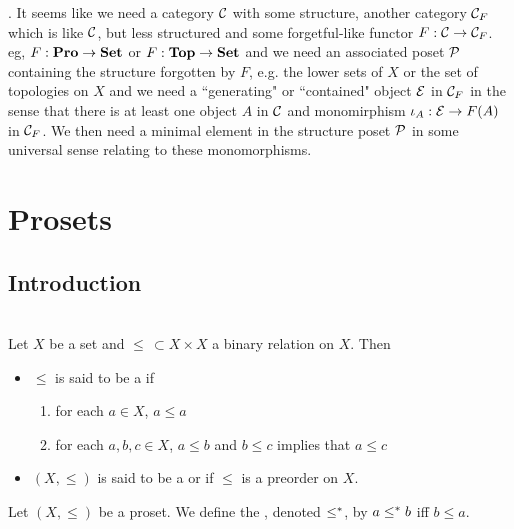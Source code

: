 \documentclass{book}
\begin{document}
	. It seems like we need a category $\mathcal{C}$ with some structure, another category $\mathcal{C}_F$ which is like $\mathcal{C}$, but less structured and some forgetful-like functor $F: \mathcal{C}\rightarrow \mathcal{C}_F$. eg, $F:\textbf{Pro} \rightarrow \text{\textbf{Set}}$ or $F:\operatorname*{\text{\textbf{Top}}} \rightarrow \text{\textbf{Set}}$ and we need an associated poset $\mathcal{P}$ containing the structure forgotten by $F$, e.g. the lower sets of $X$ or the set of topologies on $X$ and we need a ``generating" or ``contained" object $\mathcal{E}$ in $\mathcal{C}_F$ in the sense that there is at least one object $A$ in $\mathcal{C}$ and monomirphism $\iota_A: \mathcal{E} \rightarrow F(A)$ in $\mathcal{C}_F$. We then need a minimal element in the structure poset $\mathcal{P}$ in some universal sense relating to these monomorphisms. 
	
	
	
	\chapter{Prosets}
	
	\section{Introduction}
	
	\begin{defn}   \\
		Let $X$ be a set and $\leq \, \subset X \times X$ a binary relation on $X$. Then 
		\begin{itemize}
			\item $\leq$ is said to be a  if
			\begin{enumerate}
				\item for each $a \in X$, $a \leq a$
				\item for each $a, b, c \in X$, $a \leq b$ and $b \leq c$ implies that $a \leq c$
			\end{enumerate}
			\item $(X, \leq)$ is said to be a  or  if $\leq$ is a preorder on $X$.
		\end{itemize}
	\end{defn}
	
	\begin{defn} 
		Let $(X, \leq)$ be a proset. We define the , denoted $\leq^*$, by $a \leq^* b$ iff $b \leq a$.
	\end{defn}
	
\end{document}
